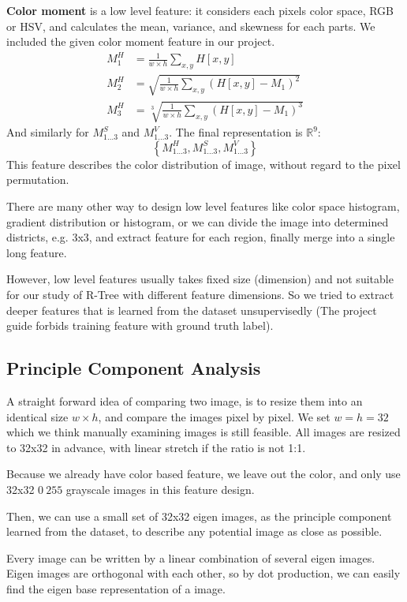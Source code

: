 \documentclass{acm_proc_article-sp}
\begin{document}
\textbf{Color moment} is a low level feature: it considers each pixels color
space, RGB or HSV, and calculates the mean, variance, and skewness for each parts.
We included the given color moment feature in our project.
\begin{align}
        M^H_1&=\frac{1}{w\times h}\sum_{x,y}H[x,y]\\
        M^H_2&=\sqrt{\frac{1}{w\times h}\sum_{x,y}(H[x,y]-M_1)^2}\\
        M^H_3&=\sqrt[3]{\frac{1}{w\times h}\sum_{x,y}(H[x,y]-M_1)^3}
\end{align}
And similarly for $M^S_{1\dots 3}$ and $M^V_{1\dots 3}$. The final
representation is $\mathbb{R}^9$:\[\left\{M^H_{1\dots 3}, M^S_{1\dots 3},
M^V_{1\dots 3}\right\}\]
This feature describes the color distribution of image, without regard to the
pixel permutation.

There are many other way to design low level features like color space histogram,
gradient distribution or histogram, or we can divide the image into determined
districts, e.g. 3x3, and extract feature for each region, finally merge into a
single long feature.

However, low level features usually takes fixed size (dimension) and not
suitable for our study of R-Tree with different feature dimensions. So we tried
to extract deeper features that is learned from the dataset unsupervisedly (The
project guide forbids training feature with ground truth label).

\subsection{Principle Component Analysis}
A straight forward idea of comparing two image, is to resize them into an
identical size $w\times h$, and compare the images pixel by pixel. We set
$w=h=32$ which we think manually examining images is still feasible. All images
are resized to 32x32 in advance, with linear stretch if the ratio is not 1:1.

Because we already have color based feature, we leave out the color, and only use 32x32 $0~255$
grayscale images in this feature design.

Then, we can use a small set of 32x32 eigen images, as the principle
component learned from the dataset, to describe any potential image as close as
possible.

Every image can be written by a linear combination of several eigen images.
Eigen images are orthogonal with each other, so by dot production, we can
easily find the eigen base representation of a image.
\end{document}
